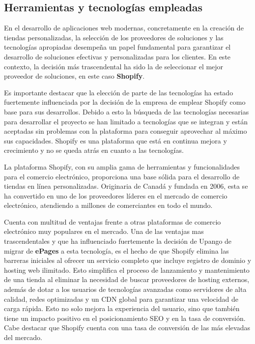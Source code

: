 \documentclass[12pt]{article}
\begin{document}
\subsection{Herramientas y tecnologías empleadas}
En el desarrollo de aplicaciones web modernas, concretamente en la creación de tiendas personalizadas, la selección de los proveedores de soluciones
y las tecnologías apropiadas desempeña un papel fundamental para garantizar el desarrollo de soluciones efectivas y personalizadas para los clientes.
En este contexto, la decisión más trascendental ha sido la de seleccionar el mejor proveedor de soluciones, en este caso \textbf{Shopify}.

Es importante destacar que la elección de parte de las tecnologías ha estado fuertemente influenciada por la decisión de la empresa de emplear Shopify
como base para sus desarrollos. Debido a esto la búsqueda de las tecnologías necesarias para desarrollar el proyecto se han limitado a
tecnologías que se integran y están aceptadas sin problemas con la plataforma para conseguir aprovechar al máximo sus capacidades. Shopify es una plataforma que está en continua mejora y crecimiento y no se queda atrás en cuanto a las tecnologías.

La plataforma Shopify, con su amplia gama de herramientas y funcionalidades para el comercio electrónico, 
proporciona una base sólida para el desarrollo de tiendas en línea personalizadas. Originaria de Canadá y 
fundada en 2006, esta se ha convertido en uno de los proveedores líderes en el mercado de comercio electrónico, 
atendiendo a millones de comerciantes en todo el mundo. 

Cuenta con multitud de ventajas frente a otras plataformas de comercio electrónico muy populares en el mercado. Una de las ventajas
mas trascendentales y que ha influenciado fuertemente  la decisión de Upango de migrar de \textbf{ePages} a esta tecnología, es el hecho de que Shopify elimina
las barreras iniciales al ofrecer un servicio completo que incluye registro de dominio y hosting web ilimitado. Esto simplifica el proceso de lanzamiento y mantenimiento
de una tienda al eliminar la necesidad de buscar proveedores de hosting externos, además de dotar a los usuarios de tecnologías avanzadas como servidores de alta
calidad, redes optimizadas y un CDN global para garantizar una velocidad de carga rápida. Esto no solo mejora la experiencia del usuario, sino que también 
tiene un impacto positivo en el posicionamiento SEO y en la tasa de conversión. Cabe destacar que Shopify cuenta con una tasa de conversión de las más
elevadas del mercado. \cite{shopify}
\end{document}
